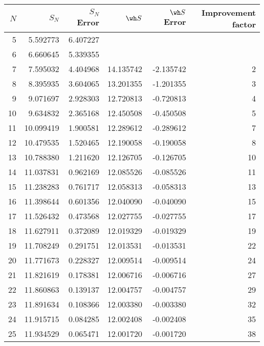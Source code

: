 \begin{tabular}{rrrrrr}
    \toprule
    $N$ & $S_N$ & $S_N$ Error & $\wh S$ & $\wh S$ Error & Improvement factor \\
    \midrule
    5 & 5.592773 & 6.407227 &  &  &  \\
    6 & 6.660645 & 5.339355 &  &  &  \\
    7 & 7.595032 & 4.404968 & 14.135742 & -2.135742 & 2 \\
    8 & 8.395935 & 3.604065 & 13.201355 & -1.201355 & 3 \\
    9 & 9.071697 & 2.928303 & 12.720813 & -0.720813 & 4 \\
    10 & 9.634832 & 2.365168 & 12.450508 & -0.450508 & 5 \\
    11 & 10.099419 & 1.900581 & 12.289612 & -0.289612 & 7 \\
    12 & 10.479535 & 1.520465 & 12.190058 & -0.190058 & 8 \\
    13 & 10.788380 & 1.211620 & 12.126705 & -0.126705 & 10 \\
    14 & 11.037831 & 0.962169 & 12.085526 & -0.085526 & 11 \\
     15 & 11.238283 & 0.761717 & 12.058313 & -0.058313 & 13 \\
     16 & 11.398644 & 0.601356 & 12.040090 & -0.040090 & 15 \\
     17 & 11.526432 & 0.473568 & 12.027755 & -0.027755 & 17 \\
     18 & 11.627911 & 0.372089 & 12.019329 & -0.019329 & 19 \\
     19 & 11.708249 & 0.291751 & 12.013531 & -0.013531 & 22 \\
     20 & 11.771673 & 0.228327 & 12.009514 & -0.009514 & 24 \\
     21 & 11.821619 & 0.178381 & 12.006716 & -0.006716 & 27 \\
     22 & 11.860863 & 0.139137 & 12.004757 & -0.004757 & 29 \\
     23 & 11.891634 & 0.108366 & 12.003380 & -0.003380 & 32 \\
     24 & 11.915715 & 0.084285 & 12.002408 & -0.002408 & 35 \\
     25 & 11.934529 & 0.065471 & 12.001720 & -0.001720 & 38 \\
    \bottomrule
\end{tabular}